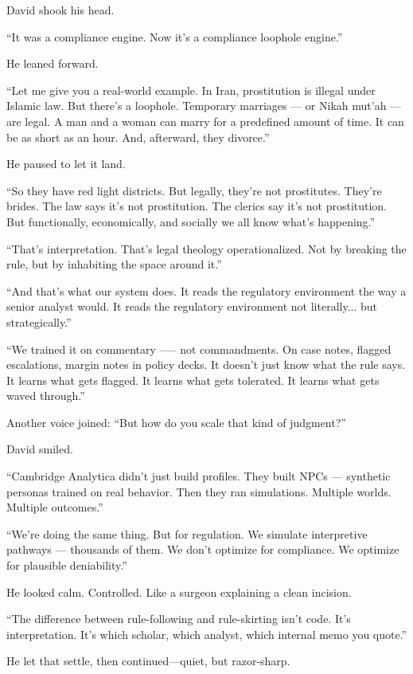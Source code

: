 David shook his head.

``It was a compliance engine. Now it's a compliance loophole engine.''

He leaned forward.

``Let me give you a real-world example. 
In Iran, prostitution is illegal under Islamic law. 
But there’s a loophole. Temporary marriages --- or Nikah mut’ah --- are legal. 
A man and a woman can marry for a predefined amount of time. 
It can be as short as an hour. 
And, afterward, they divorce.''

He paused to let it land.

``So they have red light districts. 
But legally, they’re not prostitutes. 
They’re brides. 
The law says it’s not prostitution. 
The clerics say it’s not prostitution. 
But functionally, economically, and socially we all know what’s happening.''

``That’s interpretation. 
That’s legal theology operationalized. 
Not by breaking the rule, but by inhabiting the space around it.''

``And that’s what our system does. 
It reads the regulatory environment the way a senior analyst would. 
It reads the regulatory environment not literally... but strategically.''

``We trained it on commentary --— not commandments. 
On case notes, flagged escalations, margin notes in policy decks. 
It doesn’t just know what the rule says. 
It learns what gets flagged. 
It learns what gets tolerated. 
It learns what gets waved through.''

Another voice joined: ``But how do you scale that kind of judgment?''

David smiled.

``Cambridge Analytica didn’t just build profiles. 
They built NPCs — synthetic personas trained on real behavior. 
Then they ran simulations. Multiple worlds. Multiple outcomes.''

``We’re doing the same thing. 
But for regulation. 
We simulate interpretive pathways — thousands of them. 
We don’t optimize for compliance. 
We optimize for plausible deniability.''

He looked calm. Controlled. Like a surgeon explaining a clean incision.

  ``The difference between rule-following and rule-skirting isn’t code.  
  It’s interpretation.  
  It’s which scholar, which analyst, which internal memo you quote.''

He let that settle, then continued—quiet, but razor-sharp.

